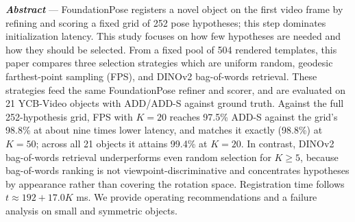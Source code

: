 \noindent\small\textbf{\textit{Abstract}} --- FoundationPose registers a novel object on the first video frame by refining and scoring a fixed grid of 252 pose hypotheses; this step dominates initialization latency. This study focuses on how few hypotheses are needed and how they should be selected. From a fixed pool of 504 rendered templates, this paper compares three selection strategies which are uniform random, geodesic farthest-point sampling (FPS), and DINOv2 bag-of-words retrieval. These strategies feed the same FoundationPose refiner and scorer, and are evaluated on 21 YCB-Video objects with ADD/ADD-S against ground truth. Against the full 252-hypothesis grid, FPS with $K{=}20$ reaches 97.5\% ADD-S against the grid's 98.8\% at about nine times lower latency, and matches it exactly (98.8\%) at $K{=}50$; across all 21 objects it attains 99.4\% at $K{=}20$. In contrast, DINOv2 bag-of-words retrieval underperforms even random selection for $K \ge 5$, because bag-of-words ranking is not viewpoint-discriminative and concentrates hypotheses by appearance rather than covering the rotation space. Registration time follows $t \approx 192 + 17.0K$ ms. We provide operating recommendations and a failure analysis on small and symmetric objects.
\par\vspace{4pt}
